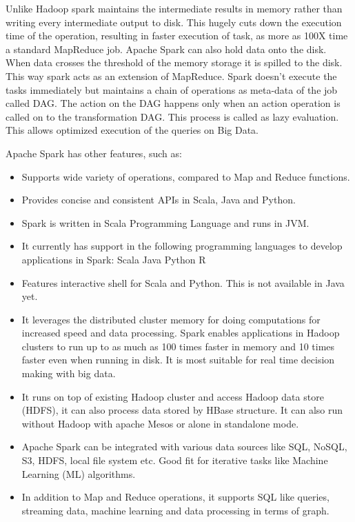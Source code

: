 Unlike Hadoop spark maintains the intermediate results in memory rather than writing every intermediate output to disk. This hugely cuts down the execution time of the operation, resulting in faster execution of task, as more as 100X time a standard MapReduce job. Apache Spark can also hold data onto the disk. When data crosses the threshold of the memory storage it is spilled to the disk. This way spark acts as an extension of MapReduce. Spark doesn’t execute the tasks immediately but maintains a chain of operations as meta-data of the job called DAG. The action on the DAG happens only when an action operation is called on to the transformation DAG. This process is called as lazy evaluation. This allows optimized execution of the queries on Big Data.

Apache Spark has other features, such as:
\\
\begin{itemize}
	\item Supports wide variety of operations, compared to Map and Reduce functions.
	\item Provides concise and consistent APIs in Scala, Java and Python.
	\item Spark is written in Scala Programming Language and runs in JVM.
	\item It currently has support in  the following programming languages to develop applications in Spark:
	\subitem Scala
	\subitem Java
	\subitem Python
	\subitem R
	\item Features interactive shell for Scala and Python. This is not available in Java yet.
	\item It leverages the distributed cluster memory for doing computations for increased speed and data processing.
	Spark enables applications in Hadoop clusters to run up to as much as 100 times faster in memory and 10 times faster even when running in disk.
	It is most suitable for real time decision making with big data.
	\item It runs on top of existing Hadoop cluster and access Hadoop data store (HDFS), it can also process data stored by HBase structure. It can also run without Hadoop with apache Mesos or alone in standalone mode.
	\item Apache Spark can be integrated with various data sources like SQL, NoSQL, S3, HDFS, local file system etc.
	Good fit for iterative tasks like Machine Learning (ML) algorithms.
	\item In addition to Map and Reduce operations, it supports SQL like queries, streaming data, machine learning and data processing in terms of graph.
\end{itemize}
